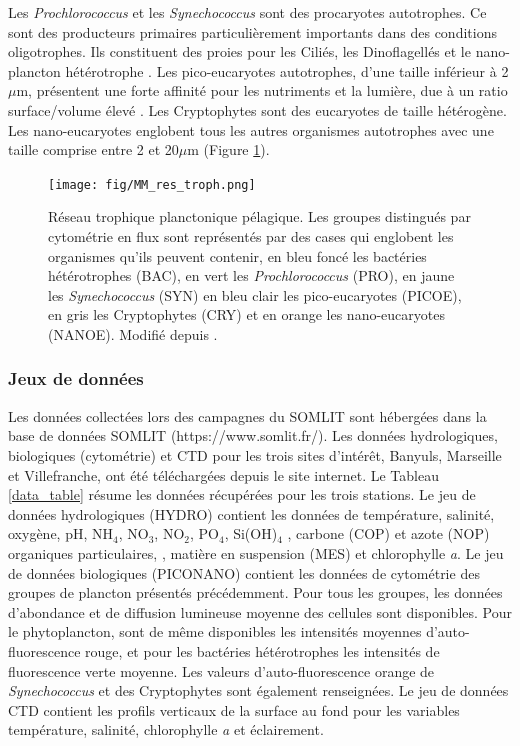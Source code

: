 \documentclass[12pt]{article}
\begin{document}
Les \textit{Prochlorococcus} et les \textit{Synechococcus} sont des procaryotes autotrophes. Ce sont des producteurs primaires particulièrement importants dans des conditions oligotrophes. Ils constituent des proies pour les Ciliés, les Dinoflagellés et le nano-plancton hétérotrophe \citep{Romagnan2015}. Les pico-eucaryotes autotrophes, d’une taille inférieur à 2$\mu$m, présentent une forte affinité pour les nutriments et la lumière, due à un ratio surface/volume élevé \citep{LeQuere2005}. Les Cryptophytes sont des eucaryotes de taille hétérogène. Les nano-eucaryotes englobent tous les autres organismes autotrophes avec une taille comprise entre 2 et 20$\mu$m (Figure \ref{groupes}). 


\begin{figure}
\centering
\texttt{[image: fig/MM\_res\_troph.png]}
\caption{Réseau trophique planctonique pélagique. Les groupes distingués par cytométrie en flux sont représentés par des cases qui englobent les organismes qu'ils peuvent contenir, en bleu foncé les bactéries hétérotrophes (BAC), en vert les \textit{Prochlorococcus} (PRO), en jaune les \textit{Synechococcus} (SYN) en bleu clair les pico-eucaryotes (PICOE), en gris les Cryptophytes (CRY) et en orange les nano-eucaryotes (NANOE). Modifié depuis \citet{Vage2015}.}
\label{groupes}
\end{figure}

\subsubsection{Jeux de données}

Les données collectées lors des campagnes du SOMLIT sont hébergées dans la base de données SOMLIT (https://www.somlit.fr/).  Les données hydrologiques, biologiques (cytométrie) et CTD pour les trois sites d’intérêt, Banyuls, Marseille et Villefranche, ont été téléchargées depuis le site internet.  Le Tableau \ref{data_table} résume les données récupérées pour les trois stations. Le jeu de données hydrologiques (HYDRO) contient les données de température, salinité, oxygène, pH, NH$_4$, NO$_3$, NO$_2$, PO$_4$, Si(OH)$_4$ , carbone (COP) et azote (NOP) organiques particulaires, , matière en suspension (MES) et  chlorophylle \textit{a}. Le jeu de données biologiques (PICONANO) contient les données de cytométrie des groupes de plancton présentés précédemment. Pour tous les groupes, les données d’abondance et de diffusion lumineuse moyenne des cellules sont disponibles. Pour le phytoplancton, sont de même disponibles les intensités moyennes d’auto-fluorescence rouge, et pour les bactéries hétérotrophes les intensités de fluorescence verte moyenne. Les valeurs d’auto-fluorescence orange de \textit{Synechococcus} et des Cryptophytes sont également renseignées. Le jeu de données CTD contient les profils verticaux de la surface au fond pour les variables température, salinité, chlorophylle \textit{a} et éclairement. 
\end{document}
